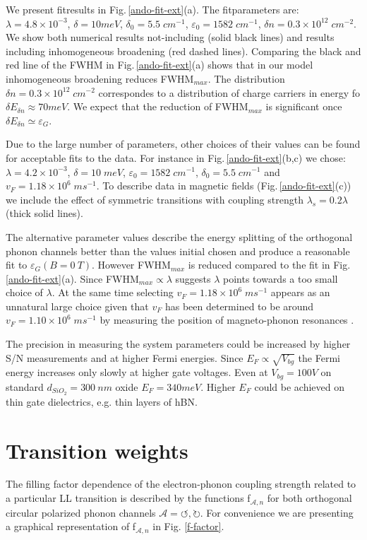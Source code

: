 \documentclass[pra,aps,superscriptaddress,preprint]{revtex4-1}
\begin{document}
We present fitresults in Fig.\,\ref{ando-fit-ext}(a). The fitparameters are: $\lambda = 4.8\times 10^{-3}$, $\delta = 10meV$, $\delta_0=5.5\; cm^{-1}$, $\varepsilon_0 = 1582\; cm^{-1}$, $\delta n = 0.3\times 10^{12}\; cm^{-2}$. We show both numerical results not-including (solid black lines) and results including inhomogeneous broadening (red dashed lines).
Comparing the black and red line of the FWHM in Fig.\,\ref{ando-fit-ext}(a) shows that in our model inhomogeneous broadening reduces FWHM$_{max}$. The distribution $\delta n = 0.3\times 10^{12}\; cm^{-2}$ correspondes to a distribution of charge carriers in energy fo $\delta E_{\delta n} \approx 70meV$. We expect that the reduction of FWHM$_{max}$ is significant once $\delta E_{\delta n}\simeq \varepsilon_G$.

Due to the large number of parameters, other choices of their values can be found for acceptable fits to the data. For instance in Fig.\,\ref{ando-fit-ext}(b,c) we chose: $\lambda=4.2\times 10^{-3}$, $\delta=10\; meV$, $\varepsilon_0=1582\; cm^{-1}$, $\delta_0=5.5\; cm^{-1}$ and $v_F=1.18\times 10^6 \; ms^{-1}$. To describe data in magnetic fields (Fig.\,\ref{ando-fit-ext}(c)) we include the effect of symmetric transitions with coupling strength $\lambda_s=0.2\lambda$ (thick solid lines).

\noindent
The alternative parameter values describe the energy splitting of the orthogonal phonon channels better than the values initial chosen and produce a reasonable fit to $\varepsilon_G(B=0\: T)$. However FWHM$_{max}$ is reduced compared to the fit in Fig.\,\ref{ando-fit-ext}(a). Since FWHM$_{max}\propto \lambda$ suggests $\lambda$ points towards a too small choice of $\lambda$. At the same time selecting $v_F = 1.18\times 10^6 \; ms^{-1}$ appears as an unnatural large choice given that $v_F$ has been determined to be around $v_F=1.10\times 10^6 \; ms^{-1}$ by measuring the position of magneto-phonon resonances \cite{kossacki2012circular,PhysRevLett.110.227402}. 

\noindent
The precision in measuring the system parameters could be increased by higher S/N measurements and at higher Fermi energies. Since $E_F \propto \sqrt{V_{bg}}$ the Fermi energy increases only slowly at higher gate voltages. Even at $V_{bg} = 100V$ on standard $d_{SiO_2}=300\: nm$ oxide $E_F = 340meV$. Higher $E_F$ could be achieved on thin gate dielectrics, e.g. thin layers of hBN. 

\newpage
\section{Transition weights}
The filling factor dependence of the electron-phonon coupling strength related to a particular LL transition is described by the functions f$_{\mathcal{A},n}$ for both orthogonal circular polarized phonon channels $\mathcal{A}=\circlearrowleft, \circlearrowright$. For convenience we are presenting a graphical representation of f$_{\mathcal{A},n}$ in Fig. \ref{f-factor}.  
\end{document}
